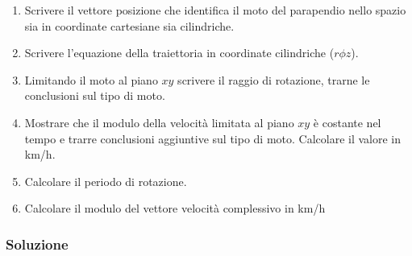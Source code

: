 \documentclass[12pt,a4paper]{book}
\begin{document}
\begin{enumerate}[label=\alph*)]
\item  Scrivere il vettore posizione che identifica il moto del parapendio nello spazio sia in coordinate cartesiane sia cilindriche.
\item Scrivere l'equazione della traiettoria in coordinate cilindriche ($r\phi z$).
\item Limitando il moto al piano $xy$ scrivere il raggio di rotazione, trarne le conclusioni sul tipo di moto.
\item Mostrare che il modulo della velocità limitata al piano $xy$ è costante nel tempo e trarre conclusioni aggiuntive sul tipo di moto. Calcolare il valore in km/h.
\item Calcolare il periodo di rotazione.
\item Calcolare il modulo del vettore velocità complessivo in km/h
\end{enumerate}

\subsubsection*{Soluzione}
\end{document}

